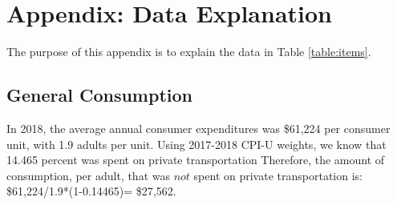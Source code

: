 \documentclass[letter, 12pt, epsf,leqno]{article}
\begin{document}
\newpage
%

\appendix

\section{Appendix: Data Explanation} \label{sec:data}
The purpose of this appendix is to explain the data in Table \ref{table:items}.

\subsection{General Consumption}
In 2018, the average annual consumer expenditures was \$61,224 per consumer unit, with 1.9 adults per unit. \citep{expenditures}  Using 2017-2018 CPI-U weights, we know that 14.465 percent was spent on private transportation \citep{cpi} Therefore, the amount of consumption, per adult, that was $not$ spent on private transportation is: \$61,224/1.9*(1-0.14465)= \$27,562.
\end{document}

